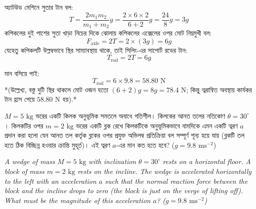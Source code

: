 \documentclass[12pt, a4paper]{article}
\begin{document}
\begin{tcolorbox}[solutionbox={সমাধান (Solution)}]
\noindent
অ্যাটউড মেশিনে সুতার টান বল:
\[ T = \frac{2 m_1 m_2}{m_1 + m_2} g = \frac{2 \times 6 \times 2}{6 + 2} g = \frac{24}{8} g = 3 g \]
কপিকলের দুই পাশের সুতা খাড়া নিচের দিকে ঝোলায় কপিকলের এক্সেলের ওপর মোট নিম্নমুখী বল:
\[ F_{\text{axle}} = 2 T = 2 \times (3 g) = 6 g \]
যেহেতু কপিকলটি উল্লম্বভাবে স্থির সাম্যাবস্থায় থাকে, তাই সিলিং-এর সাপোর্ট রডের টান:
\[ T_{\text{rod}} = 2T = 6 g \]

মান বসিয়ে পাই:
\[ T_{\text{rod}} = 6 \times 9.8 = 58.80\text{ N} \]
*(উল্লেখ্য, বস্তু দুটি স্থির থাকলে মোট ওজন হতো $(6 + 2)g = 8g = 78.4\text{ N}$; কিন্তু ত্বরান্বিত অবস্থায় কার্যকর টান হ্রাস পেয়ে $58.80\text{ N}$ হয়).*
\end{tcolorbox}



\begin{tcolorbox}[questionbox={প্রশ্ন (Question) 16}]
\noindent
$M = 5\text{ kg}$ ভরের একটি কিলক অনুভূমিক সমতলে অবাধে গতিশীল। কিলকের আনত তলের নতিকোণ $\theta = 30^\circ$। কিলকটির ওপর $m = 2\text{ kg}$ ভরের একটি ব্লক রেখে কিলকটিকে অনুভূমিকভাবে বামদিকে এমন একটি ত্বরণ $a$ প্রদান করা হলো যেন আনত তল কর্তৃক ব্লকের ওপর প্রযুক্ত অভিলম্ব প্রতিক্রিয়া বল সম্পূর্ণ শূন্য হয়ে যায় (ব্লকটি তল হতে ঠিক বিচ্ছিন্ন হওয়ার ক্রান্তি মুহূর্ত)। এই ত্বরণ $a$-এর মান কত হতে হবে? ($g = 9.8\text{ ms}^{-2}$)

\vspace{0.8em}
\begin{english}
\noindent\textit{\color{darkgray}
A wedge of mass $M = 5\text{ kg}$ with inclination $\theta = 30^\circ$ rests on a horizontal floor. A block of mass $m = 2\text{ kg}$ rests on the incline. The wedge is accelerated horizontally to the left with an acceleration $a$ such that the normal reaction force between the block and the incline drops to zero (the block is just on the verge of lifting off). What must be the magnitude of this acceleration $a$? ($g = 9.8\text{ ms}^{-2}$)
}
\end{english}
\end{tcolorbox}
\end{document}
